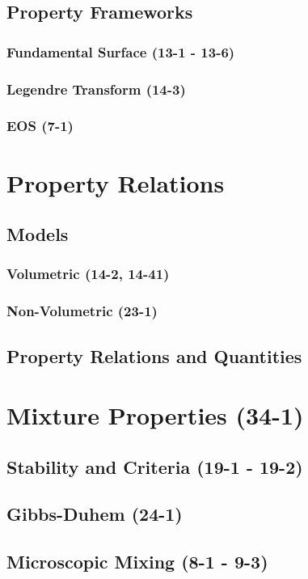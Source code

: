 \documentclass{mitqualif}
\begin{document}
\subsection{Property Frameworks}
\subsubsection{Fundamental Surface (13-1 - 13-6)}
\subsubsection{Legendre Transform (14-3)}
\subsubsection{EOS (7-1)}

\section{Property Relations}
\subsection{Models}
\subsubsection{Volumetric (14-2, 14-41)}
\subsubsection{Non-Volumetric (23-1)}
\subsection{Property Relations and Quantities}
\section{Mixture Properties (34-1)}
\subsection{Stability and Criteria (19-1 - 19-2)}
\subsection{Gibbs-Duhem (24-1)}
\subsection{Microscopic Mixing (8-1 - 9-3)}


\end{document}
